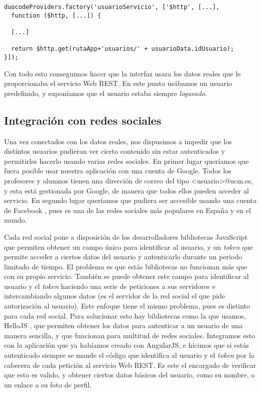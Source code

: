 \vspace{1em}
{\codesize
\lstset{}
\begin{lstlisting}[frame=single]
duocodeProviders.factory('usuarioServicio', ['$http', [...], 
  function ($http, [...]) {

  [...]
  
  return $http.get(rutaApp+'usuarios/' + usuarioData.idUsuario);
}]);
\end{lstlisting}
}
\vspace{1em}

Con todo esto conseguimos hacer que la interfaz usara los datos reales que le proporcionaba el servicio Web REST. En este punto usábamos un usuario predefinido, y suponíamos que el usuario estaba siempre \emph{logueado}.

\subsection{Integración con redes sociales\label{subsec:interfaz}}
Una vez conectados con los datos reales, nos dispusimos a impedir que los distintos usuarios pudieran ver cierto contenido sin estar autenticados y permitirles hacerlo usando varias redes sociales. En primer lugar queríamos que fuera posible usar nuestra aplicación con una cuenta de Google. Todos los profesores y alumnos tienen una dirección de correo del tipo \textless usuario\textgreater @ucm.es, y esta está gestionada por Google, de manera que todos ellos  pueden acceder al servicio. En segundo lugar queríamos que pudiera ser accesible usando una cuenta de Facebook \cite{facebook}, pues es una de las redes sociales más populares en España y en el mundo. 

\vspace{1em}
Cada red social pone a disposición de los desarrolladores bibliotecas JavaScript que permiten obtener un campo único para identificar al usuario, y un \emph{token} que permite acceder a ciertos datos del usuario y autenticarlo durante un periodo limitado de tiempo. El problema es que estás bibliotecas no funcionan más que con su propio servicio. También se puede obtener este campo para identificar al usuario y el \emph{token} haciendo una serie de peticiones a sus servidores e intercambiando algunos datos (es el servidor de la red social el que pide autorización al usuario). Este enfoque tiene el mismo problema, pues es distinto para cada red social. Para solucionar esto hay bibliotecas como la que usamos, HelloJS \cite{hello}, que permiten obtener los datos para autenticar a un usuario de una manera sencilla, y que funcionan para multitud de redes sociales. Integramos esto con la aplicación que ya habíamos creado con AngularJS, e hicimos que si estás autenticado siempre se mande el código que identifica al usuario y el \emph{token} por la cabecera de cada petición al servicio Web REST. Es este el encargado de verificar que esto es valido, y obtener ciertos datos básicos del usuario, como su nombre, o un enlace a su foto de perfil.

